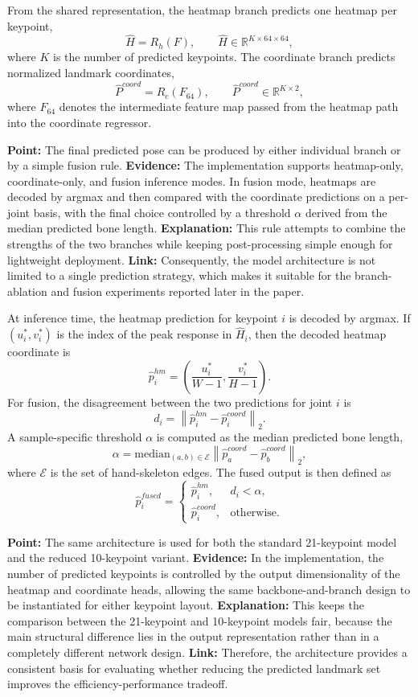 \documentclass[10pt,letterpaper]{article}
\begin{document}
From the shared representation, the heatmap branch predicts one heatmap per keypoint,
\[
\hat{H} = R_h(F), \qquad \hat{H} \in \mathbb{R}^{K \times 64 \times 64},
\]
where $K$ is the number of predicted keypoints. The coordinate branch predicts normalized landmark coordinates,
\[
\hat{P}^{coord} = R_c(F_{64}), \qquad \hat{P}^{coord} \in \mathbb{R}^{K \times 2},
\]
where $F_{64}$ denotes the intermediate feature map passed from the heatmap path into the coordinate regressor.

\medskip
\noindent\textbf{Point:} The final predicted pose can be produced by either individual branch or by a simple fusion rule.  
\textbf{Evidence:} The implementation supports heatmap-only, coordinate-only, and fusion inference modes. In fusion mode, heatmaps are decoded by argmax and then compared with the coordinate predictions on a per-joint basis, with the final choice controlled by a threshold $\alpha$ derived from the median predicted bone length.  
\textbf{Explanation:} This rule attempts to combine the strengths of the two branches while keeping post-processing simple enough for lightweight deployment.  
\textbf{Link:} Consequently, the model architecture is not limited to a single prediction strategy, which makes it suitable for the branch-ablation and fusion experiments reported later in the paper.

At inference time, the heatmap prediction for keypoint $i$ is decoded by argmax. If $(u_i^*, v_i^*)$ is the index of the peak response in $\hat{H}_i$, then the decoded heatmap coordinate is
\[
\hat{p}^{hm}_i =
\left(
\frac{u_i^*}{W-1},
\frac{v_i^*}{H-1}
\right).
\]
For fusion, the disagreement between the two predictions for joint $i$ is
\[
d_i = \left\| \hat{p}^{hm}_i - \hat{p}^{coord}_i \right\|_2.
\]
A sample-specific threshold $\alpha$ is computed as the median predicted bone length,
\[
\alpha = \mathrm{median}_{(a,b)\in \mathcal{E}}
\left\| \hat{p}^{coord}_a - \hat{p}^{coord}_b \right\|_2,
\]
where $\mathcal{E}$ is the set of hand-skeleton edges. The fused output is then defined as
\[
\hat{p}^{fused}_i =
\begin{cases}
\hat{p}^{hm}_i, & d_i < \alpha, \\
\hat{p}^{coord}_i, & \text{otherwise.}
\end{cases}
\]

\medskip
\noindent\textbf{Point:} The same architecture is used for both the standard 21-keypoint model and the reduced 10-keypoint variant.  
\textbf{Evidence:} In the implementation, the number of predicted keypoints is controlled by the output dimensionality of the heatmap and coordinate heads, allowing the same backbone-and-branch design to be instantiated for either keypoint layout.  
\textbf{Explanation:} This keeps the comparison between the 21-keypoint and 10-keypoint models fair, because the main structural difference lies in the output representation rather than in a completely different network design.  
\textbf{Link:} Therefore, the architecture provides a consistent basis for evaluating whether reducing the predicted landmark set improves the efficiency-performance tradeoff.
\end{document}
